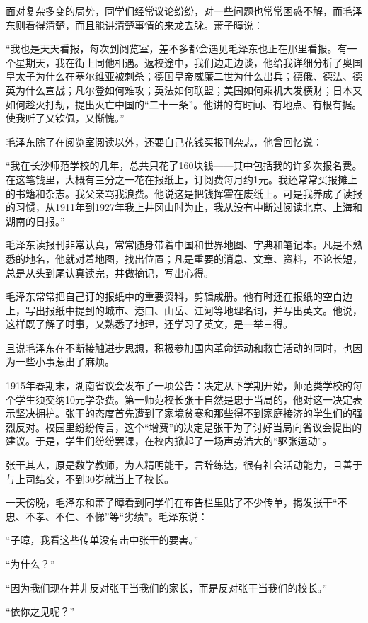 \documentclass[../../dazhuan.tex]{subfiles}
\begin{document}
面对复杂多变的局势，同学们经常议论纷纷，对一些问题也常常困惑不解，而毛泽东则看得清楚，而且能讲清楚事情的来龙去脉。萧子暲说：

“我也是天天看报，每次到阅览室，差不多都会遇见毛泽东也正在那里看报。有一个星期天，我在街上同他相遇。返校途中，我们边走边谈，他给我详细分析了奥国皇太子为什么在塞尔维亚被刺杀；德国皇帝威廉二世为什么出兵；德俄、德法、德英为什么宣战；凡尔登如何难攻；英法如何联盟；美国如何乘机大发横财；日本又如何趁火打劫，提出灭亡中国的“二十一条”。他讲的有时间、有地点、有根有据。使我听了又钦佩，又惭愧。”

毛泽东除了在阅览室阅读以外，还要自己花钱买报刊杂志，他曾回忆说：

“我在长沙师范学校的几年，总共只花了160块钱——其中包括我的许多次报名费。在这笔钱里，大概有三分之一花在报纸上，订阅费每月约1元。我还常常买报摊上的书籍和杂志。我父亲骂我浪费。他说这是把钱挥霍在废纸上。可是我养成了读报的习惯，从1911年到1927年我上井冈山时为止，我从没有中断过阅读北京、上海和湖南的日报。”

毛泽东读报刊非常认真，常常随身带着中国和世界地图、字典和笔记本。凡是不熟悉的地名，他就对着地图，找出位置；凡是重要的消息、文章、资料，不论长短，总是从头到尾认真读完，并做摘记，写出心得。 

毛泽东常常把自己订的报纸中的重要资料，剪辑成册。他有时还在报纸的空白边上，写出报纸中提到的城市、港口、山岳、江河等地理名词，并写出英文。他说，这样既了解了时事，又熟悉了地理，还学习了英文，是一举三得。

且说毛泽东在不断接触进步思想，积极参加国内革命运动和救亡活动的同时，也因为一些小事惹出了麻烦。

1915年春期末，湖南省议会发布了一项公告：决定从下学期开始，师范类学校的每个学生须交纳10元学杂费。第一师范校长张干自然是忠于当局的，他对这一决定表示坚决拥护。张干的态度首先遭到了家境贫寒和那些得不到家庭接济的学生们的强烈反对。校园里纷纷传言，这个“增费”的决定是张干为了讨好当局向省议会提出的建议。于是，学生们纷纷罢课，在校内掀起了一场声势浩大的“驱张运动”。

张干其人，原是数学教师，为人精明能干，言辞练达，很有社会活动能力，且善于与上司结交，不到30岁就当上了校长。

一天傍晚，毛泽东和萧子暲看到同学们在布告栏里贴了不少传单，揭发张干“不忠、不孝、不仁、不悌”等“劣绩”。毛泽东说：

“子暲，我看这些传单没有击中张干的要害。”

“为什么？”

“因为我们现在并非反对张干当我们的家长，而是反对张干当我们的校长。”

“依你之见呢？”
\end{document}
